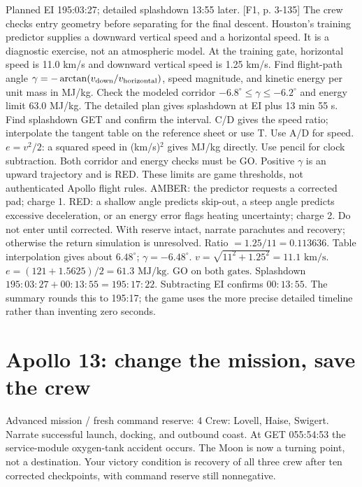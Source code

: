{Planned EI 195:03:27; detailed splashdown 13:55 later. [F1, p. 3-135]}
{The crew checks entry geometry before separating for the final descent.
Houston's training predictor supplies a downward vertical speed and a
horizontal speed. It is a diagnostic exercise, not an atmospheric model.}
{At the training gate, horizontal speed is 11.0 km/s and downward
vertical speed is 1.25 km/s. Find flight-path angle
\(\gamma=-\arctan(v_{\rm down}/v_{\rm horizontal})\), speed magnitude,
and kinetic energy per unit mass in MJ/kg.
Check the modeled corridor \(-6.8^\circ\leq\gamma\leq-6.2^\circ\)
and energy limit 63.0 MJ/kg. The detailed plan gives splashdown at
EI plus 13 min 55 s. Find splashdown GET and confirm the interval.}
{C/D gives the speed ratio; interpolate the tangent table on the
reference sheet or use T. Use A/D for speed.
\(e=v^2/2\): a squared speed in (km/s)\(^{2}\) gives MJ/kg directly.
Use pencil for clock subtraction.}
{Both corridor and energy checks must be GO. Positive \(\gamma\)
is an upward trajectory and is RED. These limits are game thresholds,
not authenticated Apollo flight rules.}
{AMBER: the predictor requests a corrected pad; charge 1.
RED: a shallow angle predicts skip-out, a steep angle predicts
excessive deceleration, or an energy error flags heating uncertainty;
charge 2. Do not enter until corrected. With reserve intact, narrate
parachutes and recovery; otherwise the return simulation is unresolved.}
{Ratio \(=1.25/11=0.113636\).
Table interpolation gives about \(6.48^\circ\);
\(\boxed{\gamma=-6.48^\circ}\).
\(v=\sqrt{11^2+1.25^2}=\boxed{11.1\text{ km/s}}\).
\(e=(121+1.5625)/2=\boxed{61.3\text{ MJ/kg}}\).
\(\boxed{\text{GO on both gates}}\).
Splashdown \(195{:}03{:}27+00{:}13{:}55
=\boxed{195{:}17{:}22}\).
Subtracting EI confirms \(\boxed{00{:}13{:}55}\).
The summary rounds this to 195:17; the game uses the more precise
detailed timeline rather than inventing zero seconds.}

\ifanswers\else
\clearpage
\section*{Apollo 13: change the mission, save the crew}
\begin{panel}{Advanced mission / fresh command reserve: 4}
Crew: Lovell, Haise, Swigert. Narrate successful launch, docking, and
outbound coast. At GET 055:54:53 the service-module oxygen-tank accident
occurs. The Moon is now a turning point, not a destination.
Your victory condition is recovery of all three crew after ten
corrected checkpoints, with command reserve still nonnegative.
\end{panel}

